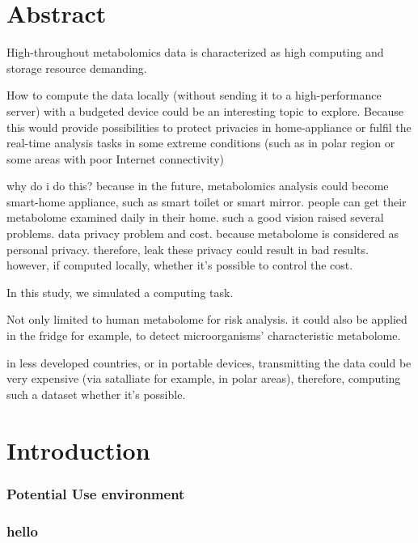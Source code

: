 \section{Abstract}


High-throughout metabolomics data is characterized as high computing and storage resource demanding. 

How to compute the data locally (without sending it to a high-performance server) with a budgeted device could be an interesting topic to explore. 
Because this would provide possibilities to protect privacies in home-appliance or fulfil the real-time analysis tasks in some extreme conditions (such as in polar region or some areas with poor Internet connectivity)


why do i do this? because in the future, metabolomics analysis could become smart-home appliance, such as smart toilet or smart mirror. 
people can get their metabolome examined daily in their home.
such a good vision raised several problems. data privacy problem and cost.
because metabolome is considered as personal privacy. therefore, leak these privacy could result in bad results. however, if computed locally, whether it's possible to control the cost.

In this study, we simulated a computing task. 


Not only limited to human metabolome for risk analysis. it could also be applied in the fridge for example, to detect microorganisms' characteristic metabolome.

in less developed countries, or in portable devices, transmitting the data could be very expensive (via satalliate for example, in polar areas), therefore, computing such a dataset whether it's possible. 

\section{Introduction}
\subsubsection{Potential Use environment}
\subsubsection{hello}